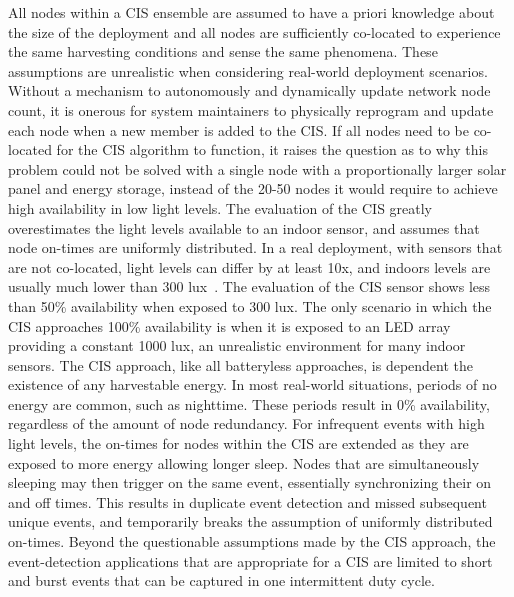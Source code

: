 All nodes within a CIS ensemble are assumed to have a priori knowledge about the size of the deployment and all nodes are sufficiently co-located to experience the same harvesting conditions and sense the same phenomena.
These assumptions are unrealistic when considering real-world deployment scenarios.
Without a mechanism to autonomously and dynamically update network node count, it is onerous for system maintainers to physically reprogram and update each node when a new member is added to the CIS.
If all nodes need to be co-located for the CIS algorithm to function, it raises the question as to why this problem could not be solved with a single node with a proportionally larger solar panel and energy storage, instead of the 20-50 nodes it would require to achieve high availability in low light levels.
The evaluation of the CIS greatly overestimates the light levels available to an indoor sensor,
and assumes that node on-times are uniformly distributed.
In a real deployment, with sensors that are not co-located, light levels can differ by at least 10x,
and indoors levels are usually much lower than 300 lux~\cite{yervaGrafting12}.
The evaluation of the CIS sensor shows less than 50\% availability when exposed to 300 lux. The only scenario in which the CIS approaches 100\% availability is when it is exposed to an LED array providing a constant 1000 lux, an unrealistic environment for many indoor sensors.
The CIS approach, like all batteryless approaches, is dependent the existence of any harvestable energy.
In most real-world situations, periods of no energy are common, such as nighttime. These periods result in 0\% availability, regardless of the amount of node redundancy.
For infrequent events with high light levels, the on-times for nodes within the CIS are extended as they are exposed to more energy allowing longer sleep. Nodes that are simultaneously sleeping may then trigger on the same event, essentially synchronizing their on and off times. This results in duplicate event detection and missed subsequent unique events, and temporarily breaks the assumption of uniformly distributed on-times.
Beyond the questionable assumptions made by the CIS approach, the event-detection applications that are appropriate for a CIS are limited to short and burst events that can be captured in one intermittent duty cycle.

